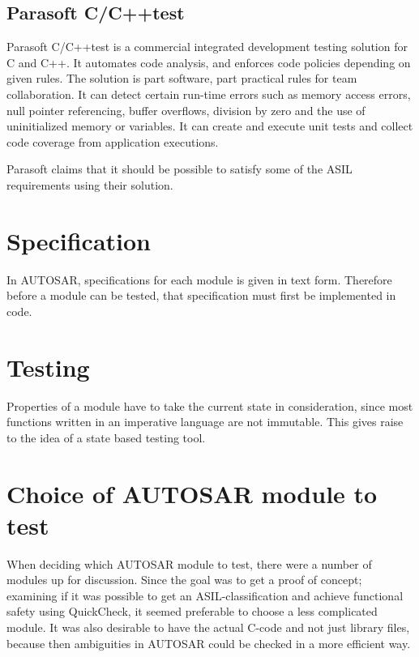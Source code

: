 \subsection{Parasoft C/C++test}
Parasoft C/C++test is a commercial integrated development testing
solution for C and C++. It automates code
analysis, and enforces code policies depending on given rules. The
solution is part software, part practical rules for team
collaboration.  It can detect certain run-time errors such as memory
access errors, null pointer referencing, buffer overflows, division by
zero and the use of uninitialized memory or variables. It can create
and execute unit tests and collect code coverage from application
executions. \cite{PARASOFT:datasheet}

Parasoft claims that it should be possible to satisfy some of the ASIL
requirements using their solution. \cite{PARASOFT:ASIL}

\section{Specification}
In AUTOSAR, specifications for each module is given in text
form. Therefore before a module can be tested, that specification must
first be implemented in code.

\section{Testing}
Properties of a module have to take the current state in
consideration, since most functions written in an imperative language
are not immutable. This gives raise to the idea of a state based
testing tool.

\section{Choice of AUTOSAR module to test}
When deciding which AUTOSAR module to test, there were a number of
modules up for discussion. Since the goal was to get a proof of
concept; examining if it was possible to get an ASIL-classification
and achieve functional safety using QuickCheck, it seemed preferable
to choose a less complicated module. It was also desirable to have the
actual C-code and not just library files, because then ambiguities in
AUTOSAR could be checked in a more efficient way.

